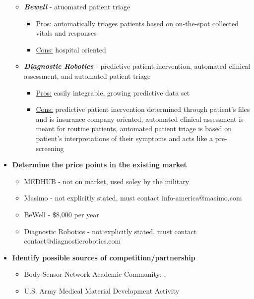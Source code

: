 \documentclass[man]{article}
\begin{document}
\begin{itemize}
\begin{itemize}
        \item \textbf{\emph{Bewell}} - atuomated patient triage \cite{bewell}
        \begin{itemize}
          \item \underline{Pros:} automatically triages patients based on on-the-spot collected vitals and responses
          \item \underline{Cons:} hospital oriented
        \end{itemize}

        \item \textbf{\emph{Diagnostic Robotics}} - predictive patient inervention, automated clinical assessment, and automated patient triage \cite{diagnosticrobotics}
        \begin{itemize}
          \item \underline{Pros:} easily integrable, growing predictive data set
          \item \underline{Cons:} predictive patient inervention determined through patient's files and is insurance company oriented, automated clinical assessment is meant for routine patients, automated patient triage is based on patient's interpretations of their symptoms and acts like a pre-screening
        \end{itemize}
      \end{itemize}

      \item \textbf{Determine the price points in the existing market}
      \begin{itemize}
        \item MEDHUB - not on market, used soley by the military
        \item Masimo - not explicitly stated, must contact info-america@masimo.com
        \item BeWell - \$8,000 per year \cite{bewell}
        \item Diagnostic Robotics - not explicitly stated, must contact contact@diagnosticrobotics.com
      \end{itemize}

      \item \textbf{Identify possible sources of competition/partnership}
      \begin{itemize}
        \item Body Sensor Network Academic Community: \cite{gupta}, \cite{pollak}
        \item U.S. Army Medical Material Development Activity \cite{medhub}
      \end{itemize}


\end{itemize}
\end{document}
